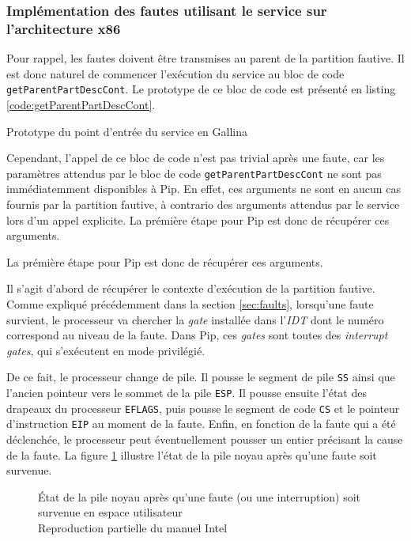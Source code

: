 		\subsubsection{Implémentation des fautes utilisant le service sur l'architecture x86}

		Pour rappel, les fautes doivent être transmises au parent de la partition fautive. Il est donc naturel de commencer l'exécution du service au bloc de code \texttt{getParentPartDescCont}. Le prototype de ce bloc de code est présenté en listing \ref{code:getParentPartDescCont}.

		\begin{listing}[!ht]
			\caption{Prototype du point d'entrée du service en Gallina}
			\label{code:getParentPartDescCont}
		\end{listing}

		Cependant, l'appel de ce bloc de code n'est pas trivial après une faute, car les paramètres attendus par le bloc de code \texttt{getParentPartDescCont} ne sont pas immédiatemment disponibles à Pip. En effet, ces arguments ne sont en aucun cas fournis par la partition fautive, à contrario des arguments attendus par le service lors d'un appel explicite. La prémière étape pour Pip est donc de récupérer ces arguments. 

		La prémière étape pour Pip est donc de récupérer ces arguments. 

		Il s'agit d'abord de récupérer le contexte d'exécution de la partition fautive. Comme expliqué précédemment dans la section \ref{sec:faults}, lorsqu'une faute survient, le processeur va chercher la \emph{gate} installée dans l'\emph{IDT} dont le numéro correspond au niveau de la faute. Dans Pip, ces \emph{gates} sont toutes des \emph{interrupt gates}, qui s'exécutent en mode privilégié.

		De ce fait, le processeur change de pile. Il pousse le segment de pile \texttt{SS} ainsi que l'ancien pointeur vers le sommet de la pile \texttt{ESP}. Il pousse ensuite l'état des drapeaux du processeur \texttt{EFLAGS}, puis pousse le segment de code \texttt{CS} et le pointeur d'instruction \texttt{EIP} au moment de la faute. Enfin, en fonction de la faute qui a été déclenchée, le processeur peut éventuellement pousser un entier précisant la cause de la faute. La figure \ref{fig:proc_interrupt_stack} illustre l'état de la pile noyau après qu'une faute soit survenue.

		\begin{figure}[!ht]
			
			\caption{État de la pile noyau après qu'une faute (ou une interruption) soit survenue en espace utilisateur\\Reproduction partielle du manuel Intel \cite{intel_interrupt_stack}}
			\label{fig:proc_interrupt_stack}
		\end{figure}

